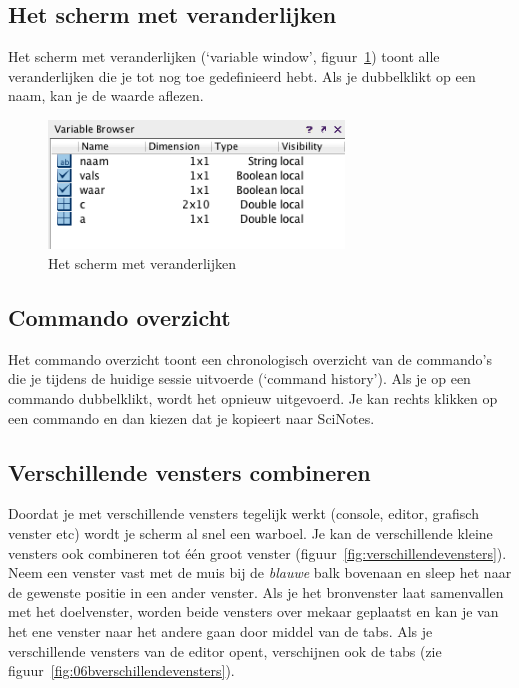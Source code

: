 \subsection{Het scherm met veranderlijken}
Het scherm met veranderlijken (`variable window', figuur~\ref{fig:05cvariableWindow}) toont alle veranderlijken die je tot nog toe gedefinieerd hebt. Als je dubbelklikt op een naam, kan je de waarde aflezen. 
\begin{figure}[htbp]
\centering
\includegraphics[width=0.7\textwidth]{figuren/scilab/05cvariableWindow}
\caption{Het scherm met veranderlijken}
\label{fig:05cvariableWindow}
\end{figure}

\subsection{Commando overzicht}
Het commando overzicht toont een chronologisch overzicht van de commando's die je tijdens de huidige sessie uitvoerde (`command history'). Als je op een commando dubbelklikt, wordt het opnieuw uitgevoerd. Je kan rechts klikken op een commando en dan kiezen dat je kopieert naar SciNotes.

\subsection{Verschillende vensters combineren}

Doordat je met verschillende vensters tegelijk werkt (console, editor, grafisch venster etc) wordt je scherm al snel een warboel. Je kan de verschillende kleine vensters ook combineren tot één groot venster (figuur~\ref{fig:verschillendevensters}). Neem een venster vast met de muis bij de \emph{blauwe} balk bovenaan en sleep het naar de gewenste positie in een ander venster. Als je het bronvenster laat samenvallen met het doelvenster, worden beide vensters over mekaar geplaatst en kan je van het ene venster naar het andere gaan door middel van de tabs. Als je verschillende vensters van de editor opent, verschijnen ook de tabs (zie figuur~\ref{fig:06bverschillendevensters}). 

